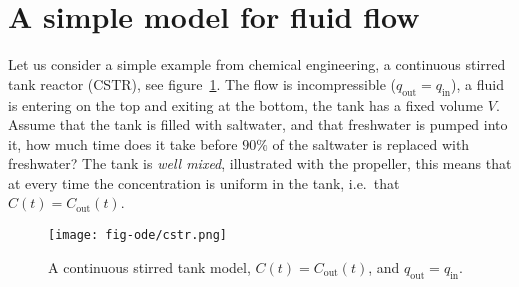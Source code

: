 \documentclass[graybox,sectrefs,envcountresetchap,open=right,final]{svmonodo}
\begin{document}
\section{A simple model for fluid flow}
Let us consider a simple example from chemical engineering, a continuous stirred tank reactor (CSTR), see figure~\ref{fig:ode:cstr}. 
The flow is incompressible ($q_\text{out}=q_\text{in}$), a fluid is entering
on the top and exiting at the bottom, the tank has a fixed volume $V$. Assume that the tank is filled with saltwater, and that freshwater is pumped into it, how much time does it 
take before $90\%$ of the saltwater is replaced with freshwater? The tank is \emph{well mixed}, illustrated with the propeller, this means that at every time the 
concentration is uniform in the tank, i.e.~that $C(t)=C_\text{out}(t)$.  

\begin{figure}[!ht]  %
  \centerline{\texttt{[image: fig-ode/cstr.png]}}
  \caption{
  A continuous stirred tank model, $C(t)=C_\text{out}(t)$, and $q_\text{out}=q_\text{in}$. \label{fig:ode:cstr}
  }
\end{figure}
\end{document}
